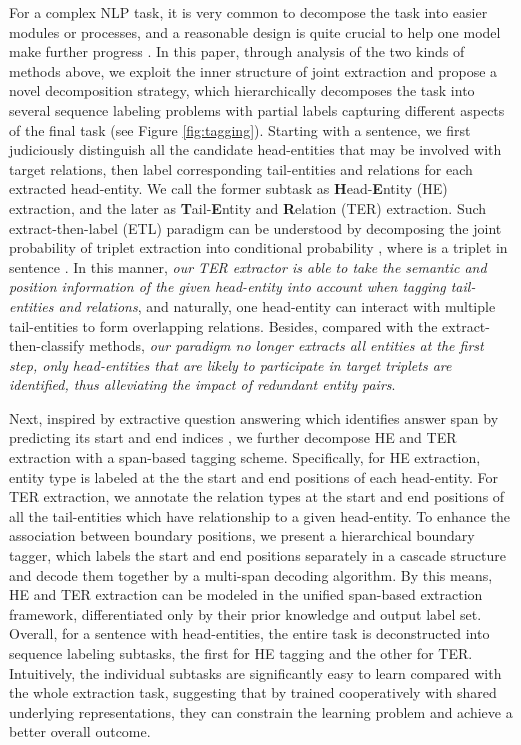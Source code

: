 \documentclass{ecai}
\begin{document}
For a complex NLP task, it is very common to decompose the task into easier modules or processes, and a reasonable design is quite crucial to help one model make further progress \cite{hu2019open,liu2018empower,zhang2019sentiment}.
In this paper, through analysis of the two kinds of methods above, we exploit the inner structure of joint extraction and propose a novel decomposition strategy, which hierarchically decomposes the task into several sequence labeling problems with partial labels capturing different aspects of the final task (see Figure \ref{fig:tagging}).
Starting with a sentence, we first judiciously distinguish all the candidate head-entities that may be involved with target relations, then label corresponding tail-entities and relations for each extracted head-entity.
We call the former subtask as \textbf{H}ead-\textbf{E}ntity (HE) extraction, and the later as \textbf{T}ail-\textbf{E}ntity and \textbf{R}elation (TER) extraction.
Such extract-then-label (ETL) paradigm can be understood by decomposing the joint probability of triplet extraction into conditional probability , where  is a triplet in sentence . 
In this manner, \emph{our TER extractor is able to take the semantic and position information of the given head-entity into account when tagging tail-entities and relations}, and naturally, one head-entity can interact with multiple tail-entities to form overlapping relations. 
Besides, compared with the extract-then-classify methods, \emph{our paradigm no longer extracts all entities at the first step, only head-entities that are likely to participate in target triplets are identified, thus alleviating the impact of redundant entity pairs}.



Next, inspired by extractive question answering which identifies answer span by predicting its start and end indices \cite{seo2016bidirectional}, we further decompose HE and TER extraction with a span-based tagging scheme. 
Specifically, for HE extraction, entity type is labeled at the the start and end positions of each head-entity.
For TER extraction, we annotate the relation types at the start and end positions of all the tail-entities which have relationship to a given head-entity. 
To enhance the association between boundary positions, we present a hierarchical boundary tagger, which labels the start and end positions separately in a cascade structure and decode them together by a multi-span decoding algorithm.
By this means, HE and TER extraction can be modeled in the unified span-based extraction framework, differentiated only by their prior knowledge and output label set.
Overall, for a sentence with  head-entities, the entire task is deconstructed into  sequence labeling subtasks, the first  for HE tagging and the other  for TER.
Intuitively, the individual subtasks are significantly easy to learn compared with the whole extraction task, suggesting that by trained cooperatively with shared underlying representations, they can constrain the learning problem and achieve a better overall outcome.
\end{document}
